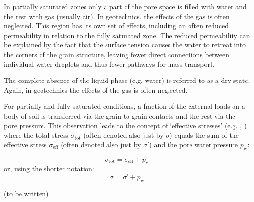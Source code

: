 In partially saturated zones only a part of the pore space is filled with water
and the rest with gas (usually air). In geotechnics, the effects of the gas is
often neglected. This region has its own set of effects, including an often
reduced permeability in relation to the fully saturated zone. The reduced
permeability can be explained by the fact that the surface tension causes the
water to retreat into the corners of the grain structure, leaving fewer direct
connections between individual water droplets and thus fewer pathways for mass
transport.

The complete absence of the liquid phase (e.g. water) is referred to as a dry
state. Again, in geotechnics the effects of the gas is often neglected.

For partially and fully saturated conditions, a fraction of the external loads
on a body of soil is transferred via the grain to grain contacts and the rest
via the pore pressure. This observation leads to the concept of ‘effective
stresses’ (e.g. ,
) where the total stress
$\sigma_\mathrm{tot}$ (often denoted also just by $\sigma$) equals the sum of
the effective stress $\sigma_\mathrm{eff}$ (often denoted also just by
$\sigma'$) and the pore water pressure $p_\mathrm{w}$:

\begin{equation}
  \sigma_\mathrm{tot} = \sigma_\mathrm{eff} + p_\mathrm{w}
\end{equation}
or, using the shorter notation:
\begin{equation}
  \sigma = \sigma' + p_\mathrm{w}
\end{equation}

(to be written)


%
%
%
%

